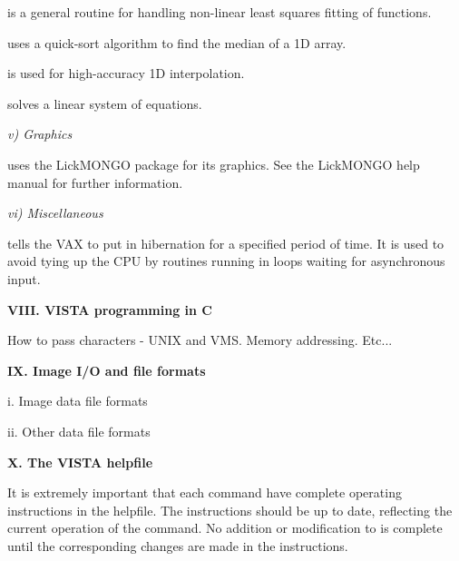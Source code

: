 \hhang
{}is a general routine for handling
non-linear least squares fitting of functions. 

\hhang
{}uses a quick-sort algorithm to find
the median of a 1D array. 

\hhang
{}is used for high-accuracy 1D
interpolation. 

\hhang
{}solves a linear system of equations.

\Sskip
\centerline  {\it v) Graphics\rm}

\vskip 0.125in
	\V uses the LickMONGO package for its graphics.  See the LickMONGO
help manual for further information.

\Sskip
\centerline  {\it vi) Miscellaneous\rm}

\hhang
{}tells the VAX to put \V in
hibernation for a specified period of time.  It is used to avoid tying
up the CPU by routines running in loops waiting for asynchronous input.

\Sskip
\centerline {\bf VIII. VISTA programming in C}

   How to pass characters - UNIX and VMS.  Memory addressing. Etc...

\Sskip
\centerline {\bf IX. Image I/O and file formats\rm}

\centerline{i. Image data file formats}

\centerline{ii. Other data file formats}








\Sskip
\centerline {\bf X. The VISTA helpfile\rm}

\vskip 0.125in
	It is extremely important that each command have complete
operating instructions in the helpfile.  The instructions should be up
to date, reflecting the current operation of the command. No addition
or modification to \V is complete until the corresponding changes are
made in the instructions. 

